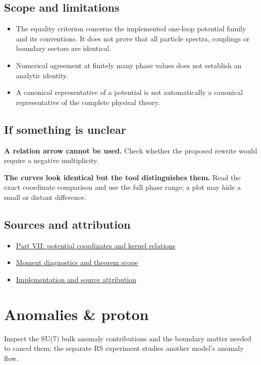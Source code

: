 \documentclass[11pt,a4paper]{article}
\begin{document}
\subsection*{Scope and limitations}
\begin{itemize}
\item The equality criterion concerns the implemented one-loop potential family and its conventions. It does not prove that all particle spectra, couplings or boundary sectors are identical.
\item Numerical agreement at finitely many phase values does not establish an analytic identity.
\item A canonical representative of a potential is not automatically a canonical representative of the complete physical theory.
\end{itemize}
\subsection*{If something is unclear}
\textbf{A relation arrow cannot be used.} Check whether the proposed rewrite would require a negative multiplicity.

\textbf{The curves look identical but the tool distinguishes them.} Read the exact coordinate comparison and use the full phase range; a plot may hide a small or distant difference.

\subsection*{Sources and attribution}
\begin{itemize}
\item \href{https://karlesmarin.github.io/ghu-explorer/papers/part-vii/index.html}{Part VII: potential coordinates and kernel relations}
\item \href{https://karlesmarin.github.io/ghu-explorer/docs/su7-certification.html}{Moment diagnostics and theorem scope}
\item \href{https://github.com/karlesmarin/ghu-lab/blob/main/src/sections/samepot_section.js}{Implementation and source attribution}
\end{itemize}
\section{Anomalies \& proton}
Inspect the SU(7) bulk anomaly contributions and the boundary matter needed to cancel them; the separate RS experiment studies another model's anomaly flow.
\end{document}
